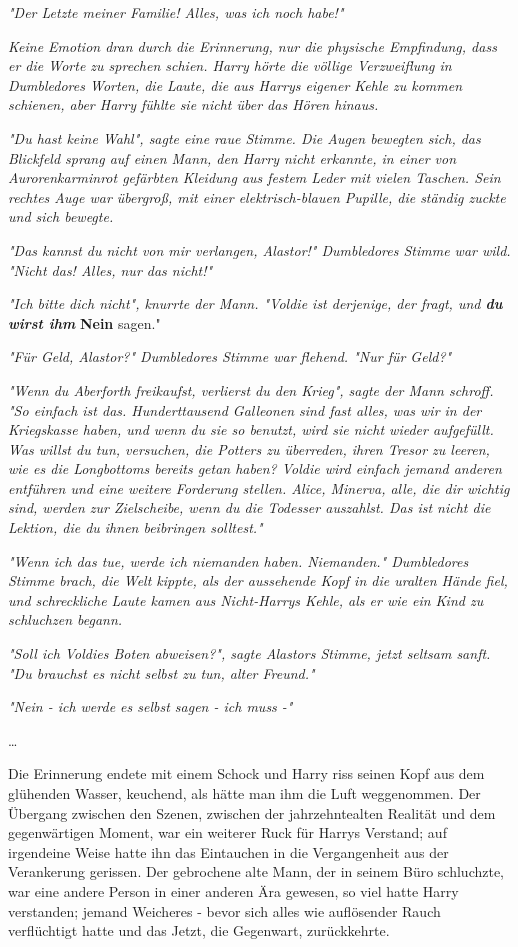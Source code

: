 {\emph{"Der Letzte meiner Familie! Alles, was ich noch habe!"}

\emph{Keine Emotion dran durch die Erinnerung, nur die physische Empfindung, dass er die Worte zu sprechen schien. Harry hörte die völlige Verzweiflung in Dumbledores Worten, die Laute, die aus Harrys eigener Kehle zu kommen schienen, aber Harry fühlte sie nicht über das Hören hinaus.}

\emph{"Du hast keine Wahl", sagte eine raue Stimme. Die Augen bewegten sich, das Blickfeld sprang auf einen Mann, den Harry nicht erkannte, in einer von Aurorenkarminrot gefärbten Kleidung aus festem Leder mit vielen Taschen. Sein rechtes Auge war übergroß, mit einer elektrisch-blauen Pupille, die ständig zuckte und sich bewegte.}

\emph{"Das kannst du nicht von mir verlangen, Alastor!" Dumbledores Stimme war wild. "Nicht das! Alles, nur das nicht!"}

\emph{"Ich bitte dich nicht", knurrte der Mann. "Voldie ist derjenige, der fragt, und \textbf{du wirst ihm}} \textbf{Nein} sagen."

\emph{"Für Geld, Alastor?" Dumbledores Stimme war flehend. "Nur für Geld?"}

\emph{"Wenn du Aberforth freikaufst, verlierst du den Krieg", sagte der Mann schroff. "So einfach ist das. Hunderttausend Galleonen sind fast alles, was wir in der Kriegskasse haben, und wenn du sie so benutzt, wird sie nicht wieder aufgefüllt. Was willst du tun, versuchen, die Potters zu überreden, ihren Tresor zu leeren, wie es die Longbottoms bereits getan haben? Voldie wird einfach jemand anderen entführen und eine weitere Forderung stellen. Alice, Minerva, alle, die dir wichtig sind, werden zur Zielscheibe, wenn du die Todesser auszahlst. Das ist nicht die Lektion, die du ihnen beibringen solltest."}

\emph{"Wenn ich das tue, werde ich niemanden haben. Niemanden." Dumbledores Stimme brach, die Welt kippte, als der aussehende Kopf in die uralten Hände fiel, und schreckliche Laute kamen aus Nicht-Harrys Kehle, als er wie ein Kind zu schluchzen begann.}

\emph{"Soll ich Voldies Boten abweisen?", sagte Alastors Stimme, jetzt seltsam sanft. "Du brauchst es nicht selbst zu tun, alter Freund."}

\emph{"Nein - ich werde es selbst sagen - ich muss -"}

…

Die Erinnerung endete mit einem Schock und Harry riss seinen Kopf aus dem glühenden Wasser, keuchend, als hätte man ihm die Luft weggenommen. Der Übergang zwischen den Szenen, zwischen der jahrzehntealten Realität und dem gegenwärtigen Moment, war ein weiterer Ruck für Harrys Verstand; auf irgendeine Weise hatte ihn das Eintauchen in die Vergangenheit aus der Verankerung gerissen. Der gebrochene alte Mann, der in seinem Büro schluchzte, war eine andere Person in einer anderen Ära gewesen, so viel hatte Harry verstanden; jemand Weicheres - bevor sich alles wie auflösender Rauch verflüchtigt hatte und das Jetzt, die Gegenwart, zurückkehrte.

}
